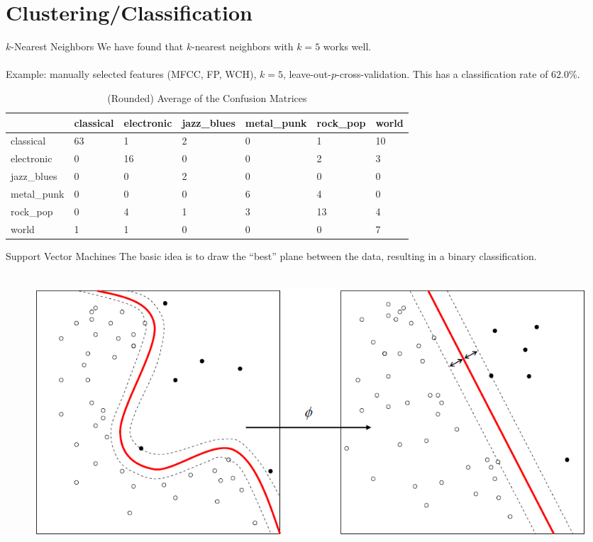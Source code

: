 \documentclass[xcolor=dvipsnames,t]{beamer} %
\begin{document}
\section{Clustering/Classification}
\begin{frame}[shrink=20]{$k$-Nearest Neighbors}
   We have found that $k$-nearest neighbors with $k=5$ works well.\\

   ~\\
   Example: manually selected features (MFCC, FP, WCH), $k=5$, leave-out-$p$-cross-validation.  This has a classification rate of $62.0\%$.

   \begin{table}[h!]
      \centering
      \begin{tabular}{ l||l | l | l | l | l | l | }
      & classical & electronic & jazz\_blues & metal\_punk & rock\_pop & world\\\hline
      classical & 63 &1 &2 &0 &1 &10 \\ \hline 
      electronic & 0 &16 &0 &0 &2 &3 \\ \hline 
      jazz\_blues & 0 &0 &2 &0 &0 &0 \\ \hline 
      metal\_punk & 0 &0 &0 &6 &4 &0 \\ \hline 
      rock\_pop & 0 &4 &1 &3 &13 &4 \\ \hline 
      world & 1 &1 &0 &0 &0 &7 \\ \hline 
      \end{tabular}
      \caption{(Rounded) Average of the Confusion Matrices}
   \end{table}

\end{frame}

\begin{frame}{Support Vector Machines}
   The basic idea is to draw the ``best'' plane between the data, resulting in a binary classification.\\

~\\[3em] %
\begin{figure}[b]
   \centering
   \includegraphics[width=\textwidth]{figures/Kernel_Machine_public.png}
\end{figure}
\end{frame}
\end{document}
